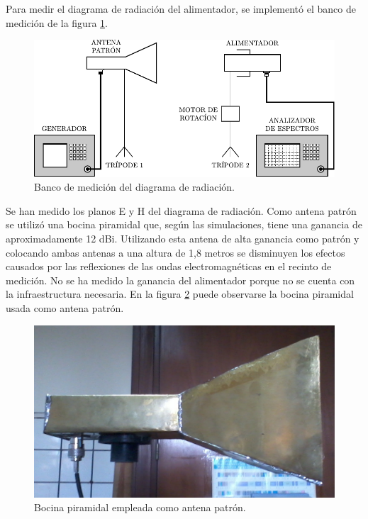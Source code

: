 Para medir el diagrama de radiación del alimentador, se implementó el banco de medición de la figura \ref{fig_resultados:17}.
\begin{figure}[H]
\centering
\includegraphics[scale = 1]{Figures/Resultados/resultados_17}
\caption{Banco de medición del diagrama de radiación.}
\label{fig_resultados:17}
\end{figure}
Se han medido los planos E y H del diagrama de radiación. Como antena patrón se utilizó una bocina piramidal que, según las simulaciones, tiene una ganancia de aproximadamente 12 dBi. Utilizando esta antena de alta ganancia como patrón y colocando ambas antenas a una altura de 1,8 metros se disminuyen los efectos causados por las reflexiones de las ondas electromagnéticas en el recinto de medición. No se ha medido la ganancia del alimentador porque no se cuenta con la infraestructura necesaria. En la figura \ref{fig_resultados:18} puede observarse la bocina piramidal usada como antena patrón.
\begin{figure}[H]
\centering
\includegraphics[scale = 0.27]{Figures/Resultados/resultados_18}
\caption{Bocina piramidal empleada como antena patrón.}
\label{fig_resultados:18}
\end{figure}
